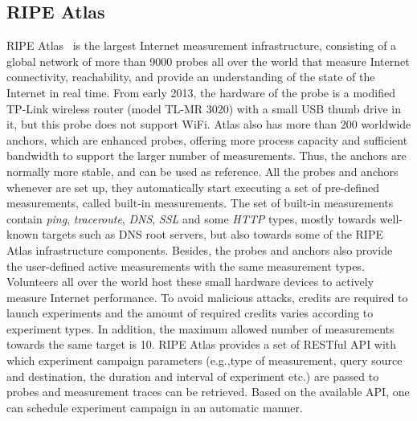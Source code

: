 \subsection{RIPE Atlas}
\label{subsec:atlas}
RIPE Atlas~\cite{atlas} is the largest Internet measurement infrastructure, consisting of a global network of more than 9000 probes all over the world that measure Internet connectivity, reachability, and provide an understanding of the state of the Internet in real time. From early 2013, the hardware of the probe is a modified TP-Link wireless router (model TL-MR 3020) with a small USB thumb drive in it, but this probe does not support WiFi. Atlas also has more than 200 worldwide anchors, which are enhanced probes, offering more process capacity and sufficient bandwidth to support the larger number of measurements. Thus, the anchors are normally more stable, and can be used as reference. All the probes and anchors whenever are set up, they automatically start executing a set of pre-defined measurements, called built-in measurements. The set of built-in measurements contain \emph{ping}, \emph{traceroute}, \emph{DNS}, \emph{SSL} and some \emph{HTTP} types, mostly towards well-known targets such as DNS root servers, but also towards some of the RIPE Atlas infrastructure components. Besides, the probes and anchors also provide the user-defined active measurements with the same measurement types. Volunteers all over the world host these small hardware devices to actively measure Internet performance. To avoid malicious attacks, credits are required to launch experiments and the amount of required credits varies according to experiment types. In addition, the maximum allowed number of measurements towards the same target is 10. RIPE Atlas provides a set of RESTful API with which experiment campaign parameters (e.g.,type of measurement, query source and destination, the duration and interval of experiment etc.) are passed to probes and measurement traces can be retrieved. Based on the available API, one can schedule experiment campaign in an automatic manner.

